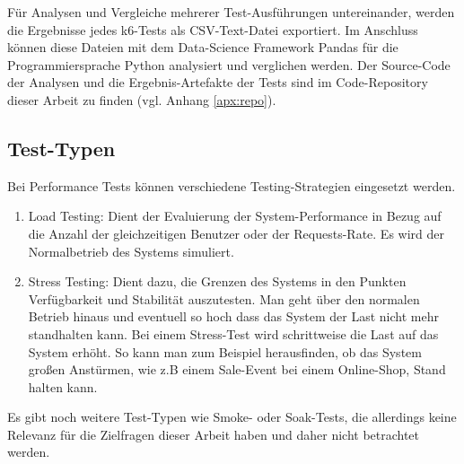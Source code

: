Für Analysen und Vergleiche mehrerer Test-Ausführungen untereinander, werden die Ergebnisse jedes k6-Tests als CSV-Text-Datei exportiert. Im Anschluss können diese Dateien mit dem Data-Science Framework Pandas\cite{noauthor_pandas_nodate} für die Programmiersprache Python analysiert und verglichen werden. Der Source-Code der Analysen und die Ergebnis-Artefakte der Tests sind im Code-Repository dieser Arbeit zu finden (vgl. Anhang \ref{apx:repo}).

\subsection{Test-Typen}
Bei Performance Tests können verschiedene Testing-Strategien eingesetzt werden.
\begin{enumerate}
    \item Load Testing: Dient der Evaluierung der System-Performance in Bezug auf die Anzahl der gleichzeitigen Benutzer oder der Requests-Rate. Es wird der Normalbetrieb des Systems simuliert\cite{noauthor_what_nodate}.
    
    \item Stress Testing: Dient dazu, die Grenzen des Systems in den Punkten Verfügbarkeit und  Stabilität auszutesten. Man geht über den normalen Betrieb hinaus und eventuell so hoch dass das System der Last nicht mehr standhalten kann. Bei einem Stress-Test wird schrittweise die Last auf das System erhöht. So kann man zum Beispiel herausfinden, ob das System großen Anstürmen, wie z.B einem Sale-Event bei einem Online-Shop, Stand halten kann\cite{noauthor_what_nodate-2}.
\end{enumerate}

Es gibt noch weitere Test-Typen wie Smoke- oder Soak-Tests, die allerdings keine Relevanz für die Zielfragen dieser Arbeit haben und daher nicht betrachtet werden.

